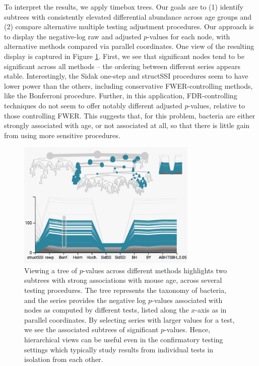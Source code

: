 \documentclass[12pt]{article}
\begin{document}
To interpret the results, we apply timebox trees. Our goals are to (1) identify
subtrees with consistently elevated differential abundance across age groups and
(2) compare alternative multiple testing adjustment procedures. Our approach is
to display the negative-log raw and adjusted $p$-values for each node, with
alternative methods compared via parallel coordinates. One view of the resulting
display is captured in Figure \ref{fig:structssi}. First, we see that
significant nodes tend to be significant across all methods -- the ordering
between different series appears stable. Interestingly, the Sidak one-step and
structSSI procedures seem to have lower power than the others, including
conservative FWER-controlling methods, like the Bonferroni procedure. Further,
in this application, FDR-controlling techniques do not seem to offer notably
different adjusted $p$-values, relative to those controlling FWER. This suggests
that, for this problem, bacteria are either strongly associated with age, or not
associated at all, so that there is little gain from using more sensitive
procedures.

\begin{figure}

{\centering \includegraphics[width=325px]{figure/structssi}

}

\caption{Viewing a tree of $p$-values across different methods highlights two
  subtrees with strong associations with mouse age, across several testing
  procedures. The tree represents the taxonomy of bacteria, and the series
  provides the negative log $p$-values associated with nodes as computed by
  different tests, listed along the $x$-axis as in parallel coordinates. By
  selecting series with larger values for a test, we see the associated subtrees
  of significant $p$-values. Hence, hierarchical views can be useful even in the
  confirmatory testing settings which typically study results from individual
  tests in isolation from each other.\label{fig:structssi}}
\end{figure}
\end{document}
